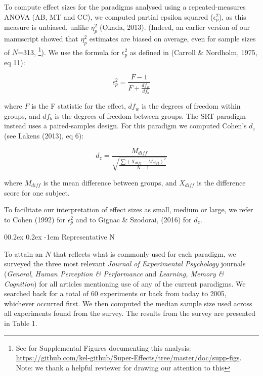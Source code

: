 \documentclass[
  man]{apa6}
\makeatletter
\let\oldparagraph\paragraph
\renewcommand{\paragraph}[1]{\oldparagraph{#1}\mbox{}}
\renewcommand{\paragraph}{\@startsection{paragraph}{4}{\parindent}%
  {0\baselineskip \@plus 0.2ex \@minus 0.2ex}%
  {-1em}%
  {\normalfont\normalsize\bfseries\itshape\typesectitle}}
\makeatother
\begin{document}
To compute effect sizes for the paradigms analysed using a repeated-measures ANOVA (AB, MT and CC), we computed partial epsilon squared (\(\epsilon_{p}^2\)), as this measure is unbiased, unlike \(\eta_{p}^2\) (Okada, 2013). (Indeed, an earlier version of our manuscript showed that \(\eta_{p}^2\) estimates are biased on average, even for sample sizes of \(N\)=313, \footnote{See for Supplemental Figures documenting this analysis: \url{https://github.com/kel-github/Super-Effects/tree/master/doc/supp-figs}. Note: we thank a helpful reviewer for drawing our attention to this}). We use the formula for \(\epsilon_{p}^2\) as defined in (Carroll \& Nordholm, 1975, eq 11):

\begin{equation}
\epsilon_{p}^{2} = \frac{F-1}{F + \frac{df_w}{df_b}}
\end{equation}

where \(F\) is the F statistic for the effect, \(df_{w}\) is the degrees of freedom within groups, and \(df_{b}\) is the degrees of freedom between groups. The SRT paradigm instead uses a paired-samples design. For this paradigm we computed Cohen's \(d_{z}\) (see Lakens (2013), eq 6):

\begin{equation}
d_{z} = \frac{M_{diff}}{\sqrt{\frac{\sum(X_{diff} - M_{diff})^2}{N-1}}}
\end{equation}

where \(M_{diff}\) is the mean difference between groups, and \(X_{diff}\) is the difference score for one subject.

To facilitate our interpretation of effect sizes as small, medium or large, we refer to Cohen (1992) for \(\epsilon_{p}^2\) and to Gignac \& Szodorai, (2016) for \(d_z\).

\hypertarget{representative-n}{%
\paragraph{Representative N}\label{representative-n}}

To attain an \(N\) that reflects what is commonly used for each paradigm, we surveyed the three most relevant \emph{Journal of Experimental Psychology} journals (\emph{General}, \emph{Human Perception \& Performance} and \emph{Learning, Memory \& Cognition}) for all articles mentioning use of any of the current paradigms. We searched back for a total of 60 experiments or back from today to 2005, whichever occurred first. We then computed the median sample size used across all experiments found from the survey. The results from the survey are presented in Table 1.
\end{document}
